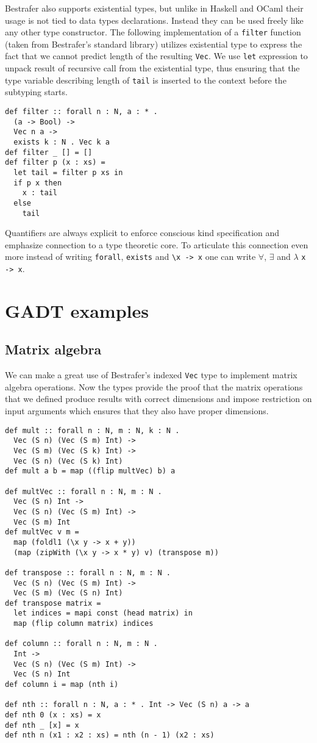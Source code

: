 \documentclass[declaration,shortabstract,english]{iithesis}
\begin{document}
Bestrafer also supports existential types, but unlike in Haskell and OCaml their usage is not tied to data types declarations.
Instead they can be used freely like any other type constructor. The following implementation of a \verb+filter+ function
(taken from Bestrafer's standard library) utilizes existential type to express the fact that we cannot predict length of
the resulting \verb+Vec+. We use \verb+let+ expression to unpack result of recursive call from the existential type, thus
ensuring that the type variable describing length of \verb+tail+ is inserted to the context before the subtyping starts.
\begin{verbatim}
def filter :: forall n : N, a : * .
  (a -> Bool) ->
  Vec n a ->
  exists k : N . Vec k a
def filter _ [] = []
def filter p (x : xs) =
  let tail = filter p xs in
  if p x then
    x : tail
  else
    tail
\end{verbatim}

Quantifiers are always explicit to enforce conscious kind specification and emphasize connection to a type theoretic core.
To articulate this connection even more instead of writing \verb+forall+, \verb+exists+ and \verb+\x -> x+ one can write
$\forall$, $\exists$ and $\lambda$ \verb+x -> x+.
\section{GADT examples}
\subsection*{Matrix algebra}
We can make a great use of Bestrafer's indexed \verb+Vec+ type to implement matrix algebra operations.
Now the types provide the proof that the matrix operations that we defined produce results with
correct dimensions and impose restriction on input arguments which ensures that they also have
proper dimensions.
\begin{verbatim}
def mult :: forall n : N, m : N, k : N .
  Vec (S n) (Vec (S m) Int) ->
  Vec (S m) (Vec (S k) Int) ->
  Vec (S n) (Vec (S k) Int)
def mult a b = map ((flip multVec) b) a

def multVec :: forall n : N, m : N .
  Vec (S n) Int ->
  Vec (S n) (Vec (S m) Int) ->
  Vec (S m) Int
def multVec v m =
  map (foldl1 (\x y -> x + y))
  (map (zipWith (\x y -> x * y) v) (transpose m))

def transpose :: forall n : N, m : N .
  Vec (S n) (Vec (S m) Int) ->
  Vec (S m) (Vec (S n) Int)
def transpose matrix =
  let indices = mapi const (head matrix) in
  map (flip column matrix) indices

def column :: forall n : N, m : N .
  Int ->
  Vec (S n) (Vec (S m) Int) ->
  Vec (S n) Int
def column i = map (nth i)

def nth :: forall n : N, a : * . Int -> Vec (S n) a -> a
def nth 0 (x : xs) = x
def nth _ [x] = x
def nth n (x1 : x2 : xs) = nth (n - 1) (x2 : xs)
\end{verbatim}
\end{document}
